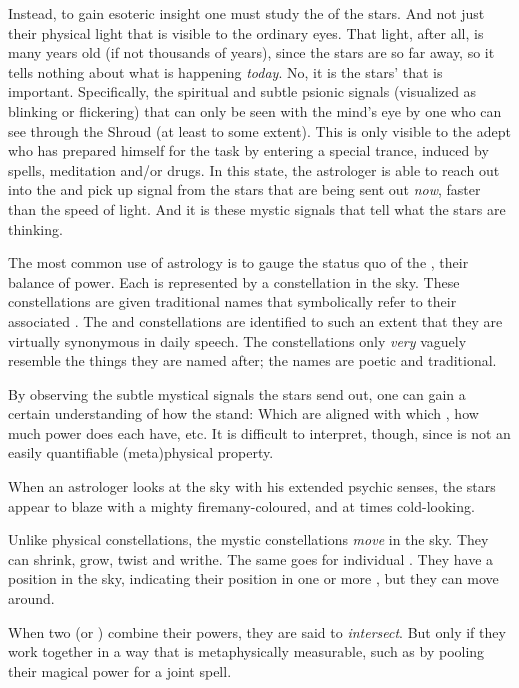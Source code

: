 Instead, to gain esoteric insight one must study the \emph{\colours} of the stars. 
And not just their physical light that is visible to the ordinary eyes. 
That light, after all, is many years old (if not thousands of years), since the stars are so far away, so it tells nothing about what is happening \emph{today}. 
No, it is the stars'  that is important. 
Specifically, the spiritual \colours and subtle psionic signals (visualized as blinking or flickering) that can only be seen with the mind's eye by one who can see through the Shroud (at least to some extent). 
This  is only visible to the adept who has prepared himself for the task by entering a special trance, induced by spells, meditation and/or drugs. 
In this state, the astrologer is able to reach out into the  and pick up signal from the stars that are being sent out \emph{now}, faster than the speed of light. 
And it is these mystic signals that tell what the stars are thinking. 

The most common use of astrology is to gauge the status quo of the \matrices, their balance of power. 
Each \matrix{} is represented by a constellation in the sky. 
These constellations are given traditional names that symbolically refer to their associated \matrix. 
The \matrices{} and constellations are identified to such an extent that they are virtually synonymous in daily speech. 
The constellations only \emph{very} vaguely resemble the things they are named after; the names are poetic and traditional. 

By observing the subtle mystical signals the stars send out, one can gain a certain understanding of how the \matrices{} stand: 
Which \vertices{} are aligned with which \matrices, how much power does each \matrix{} have, etc. 
It is difficult to interpret, though, since  is not an easily quantifiable (meta)physical property. 

When an astrologer looks at the sky with his extended psychic senses, the stars appear to blaze with a mighty fire\dash many-coloured, and at times cold-looking.

Unlike physical constellations, the mystic constellations \emph{move} in the sky. 
They can shrink, grow, twist and writhe. 
The same goes for individual \vertices.
They have a position in the sky, indicating their position in one or more \matrices, but they can move around.  

When two \matrices{} (or \vertices) combine their powers, they are said to \emph{intersect}.
But only if they work together in a way that is metaphysically measurable, such as by pooling their magical power for a joint spell. 





